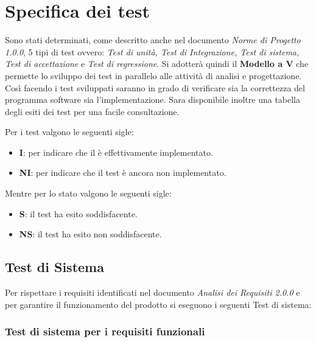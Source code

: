 
\section{Specifica dei test}

Sono stati determinati, come descritto anche nel documento \textit{Norme di Progetto 1.0.0}, 5 tipi di test ovvero: \textit{Test di unità, Test di Integrazione, Test di sistema, Test di accettazione} e \textit{Test di regressione}. Si adotterà quindi il \textbf{Modello a V}\glo{} che permette lo sviluppo dei test in parallelo alle attività di analisi e progettazione. Così facendo i test sviluppati saranno in grado di verificare sia la correttezza del programma software sia l'implementazione. Sara disponibile inoltre una tabella degli esiti dei test per una facile consultazione.

Per i test valgono le seguenti sigle:

    \begin{itemize}
        \item \textbf{I}: per indicare che il è effettivamente implementato.
        \item \textbf{NI}: per indicare che il test è ancora non implementato.
    \end{itemize}
    
Mentre per lo stato valgono le seguenti sigle:

    \begin{itemize}
        \item \textbf{S}: il test ha esito soddisfacente.
        \item \textbf{NS}: il test ha esito non soddisfacente.
    \end{itemize}
    

 
\subsection{Test di Sistema}

    Per rispettare i requisiti identificati nel documento \textit{Analisi dei Requisiti 2.0.0} e per garantire il funzionamento del prodotto si eseguono i seguenti Test di sistema:\\
    
\subsubsection{Test di sistema per i requisiti funzionali}
    \hphantom{}

